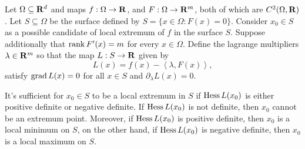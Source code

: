 \begin{theorem}
\label{thm:sufficient-extremum}
Let \(\Omega \subseteq \mathbf{R}^d\) and maps \(f: \Omega \to \mathbf{R}\), and  \(F: \Omega \to \mathbf{R}^m\), both of which
are \(C^2(\Omega, \mathbf{R})\). Let \(S \subseteq \Omega\) be the surface defined by \(S = \{x \in \Omega \colon
F(x) = 0\}\). Consider \(x_0 \in S\) as a possible candidate of local extremum
of \(f\) in the surface \(S\). Suppose additionally that \(\operatorname{rank} F'(x) =
m\) for every \(x \in \Omega\). Define the lagrange multipliers \(\lambda \in \mathbf{R}^m\) so that
the map \(L: S \to \mathbf{R}\) given by
\[
  L(x) = f(x) - \left\langle \lambda, F(x) \right\rangle,
\]
satisfy \(\operatorname{grad} L(x) = 0\) for all \(x \in S\) and \(\partial_{\lambda} L(x) = 0\).

It's sufficient for \(x_0 \in S\) to be a local extremum in \(S\) if \(\operatorname{Hess}
L(x_0)\) is either positive definite or negative definite. If \(\operatorname{Hess} L(x_0)\)
is not definite, then \(x_0\) cannot be an extremum point. Moreover, if \(\operatorname{Hess}
L(x_0)\) is positive definite, then \(x_0\) is a local minimum on \(S\), on the
other hand, if \(\operatorname{Hess} L(x_0)\) is negative definite, then \(x_0\) is a local
maximum on \(S\).
\end{theorem}

